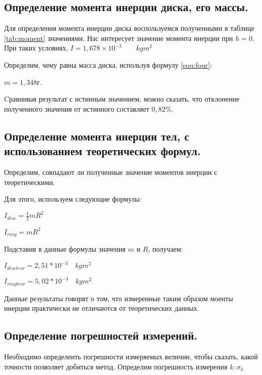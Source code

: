\documentclass[12pt,a4paper]{article}
\begin{document}
		\newpage
		
	\subsection{Определение момента инерции диска, его массы.}
	
		
		Для определения момента инерции диска воспользуемся полученными в таблице \ref{tab:moment} значениями. Нас  интересует значение момента инерции при $ h = 0$. При таких условиях, $ I = 1,678 \times 10^{-3} \qquad kgm^2 $
		
		Определим, чему равна масса диска, используя формулу \ref{equ:four}:
		
		$ m = 1,348$г.
		
		Cравнивая результат с истинным значением, можно сказать, что отклонение полученного значения от истинного составляет $ 0,82 \% $.
		
	\subsection{Определение момента инерции тел, с использованием теоретических формул.}
		Определим, совпадают ли полученные значение моментов инерции с теоретическими.
		
		Для этого, используем следующие формулы:
		
		\newpage
		
		\begin{flushleft}
			\begin{spacing}{1.6}
				$ I_{disc} = \frac{1}{2}mR^2 $
				
				$ I_{ring} = mR^2 $
			\end{spacing}
		\end{flushleft}
		
		Подставив в данные формулы значения $ m $ и $ R $, получаем:		
		
		\begin{flushleft}
			\begin{spacing}{1.6}
				$ I_{disc teor} =  2,51 * 10^{-3} \quad kgm^2 $ 
				
				$ I_{ring teor} = 5,02 * 10^{-3} \quad kgm^2 $
			\end{spacing}
		\end{flushleft}	


		Данные результаты говорят о том, что измеренные таким образом моенты инерции практически не отличаются от теоретических данных.	 
	\subsection{Определение погрешностей измерений.}
		Необходимо определеить погрешности измеряемых величин, чтобы сказать, какой точности позволяет добиться метод. 
		Определим погрешность измерения $k : \sigma_{k}$
	
\end{document}
